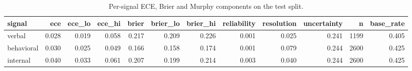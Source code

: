 \begin{table}
\caption{Per-signal ECE, Brier and Murphy components on the test split.}
\label{tab:t6_h1_murphy_decomposition}
\begin{tabular}{lrrrrrrrrrrr}
\toprule
signal & ece & ece\_lo & ece\_hi & brier & brier\_lo & brier\_hi & reliability & resolution & uncertainty & n & base\_rate \\
\midrule
verbal & 0.028 & 0.019 & 0.058 & 0.217 & 0.209 & 0.226 & 0.001 & 0.025 & 0.241 & 1199 & 0.405 \\
behavioral & 0.030 & 0.025 & 0.049 & 0.166 & 0.158 & 0.174 & 0.001 & 0.079 & 0.244 & 2600 & 0.425 \\
internal & 0.040 & 0.033 & 0.061 & 0.207 & 0.199 & 0.214 & 0.003 & 0.040 & 0.244 & 2600 & 0.425 \\
\bottomrule
\end{tabular}
\end{table}
